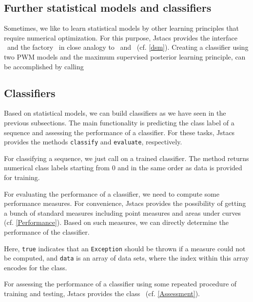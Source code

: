 \subsection{Further statistical models and classifiers}

Sometimes, we like to learn statistical models by other learning principles that require numerical optimization. For this purpose, Jstacs provides the interface \DiffSM~and the factory \DiffSMFactory~in close analogy to \TrainSM~and \TrainSMFactory~(cf. \ref{dsm}). Creating a classifier using two PWM models and the maximum supervised posterior learning principle, can be accomplished by calling
\renewcommand{\codefile}{recipes/CreateMSPClassifier.java}
\setcounter{off}{49}
\addtocounter{off}{2}
\addtocounter{off}{2}

\subsection{Classifiers}

\renewcommand{\codefile}{recipes/TrainClassifier.java}
Based on statistical models, we can build classifiers as we have seen in the previous subsections. The main functionality is predicting the class label of a sequence and assessing the performance of a classifier. For these tasks, Jstacs provides the methods \lstinline+classify+ and \lstinline+evaluate+, respectively.

For classifying a sequence, we just call
\setcounter{off}{58}
on a trained classifier. The method returns numerical class labels starting from $0$ and in the same order as data is provided for training.

For evaluating the performance of a classifier, we need to compute some performance measures. For convenience, Jstacs provides the possibility of getting a bunch of standard measures including point measures and areas under curves (cf. \ref{Performance}). Based on such measures, we can directly determine the performance of the classifier.
\addtocounter{off}{5}
Here, \lstinline+true+ indicates that an \lstinline+Exception+ should be thrown if a measure could not be computed, and \lstinline+data+ is an array of data sets, where the index within this array encodes for the class.

For assessing the performance of a classifier using some repeated procedure of training and testing, Jstacs provides the class \ClassifierAssessment~(cf. \ref{Assessment}).

\renewcommand{\codefile}{\defaultcodefile}
\setcounter{off}{1}